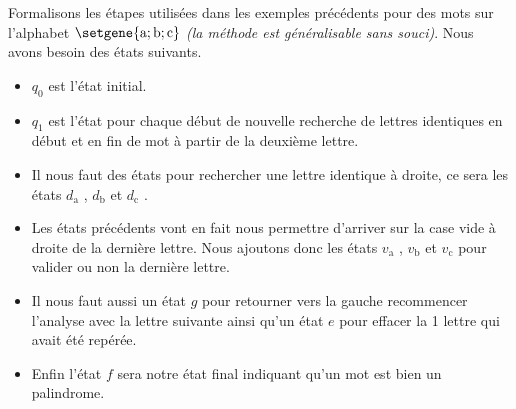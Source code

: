 Formalisons les étapes utilisées dans les exemples précédents pour des mots sur l'alphabet $\setgene{\text{a} ; \text{b} ; \text{c}}$ \emph{(la méthode est généralisable sans souci)}. Nous avons besoin des états suivants.

\begin{itemize}[label = \small\textbullet]
	\item $q_0$ est l'état initial.

	\item $q_1$ est l'état pour chaque début de nouvelle recherche de lettres identiques en début et en fin de mot à partir de la deuxième lettre.

	\item Il nous faut des états pour rechercher une lettre identique à droite, ce sera les états $d_\text{a}$ , $d_\text{b}$ et $d_\text{c}$ .
	
	\item Les états précédents vont en fait nous permettre d'arriver sur la case vide à droite de la dernière lettre. Nous ajoutons donc les états $v_\text{a}$ , $v_\text{b}$ et $v_\text{c}$ pour valider ou non la dernière lettre.
	
	\item Il nous faut aussi un état $g$ pour retourner vers la gauche recommencer l'analyse avec la lettre suivante ainsi qu'un état $e$ pour effacer la 1\iere{} lettre qui avait été repérée.
	
	\item Enfin l'état $f$ sera notre état final indiquant qu'un mot est bien un palindrome.
\end{itemize}

